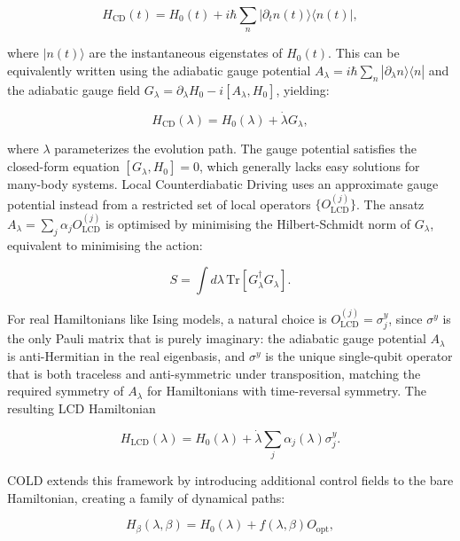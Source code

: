 \begin{equation}
    H_{\text{CD}}(t) = H_0(t) + i\hbar\sum_n |\partial_t n(t)\rangle\langle n(t)|,
\end{equation}

where $|n(t)\rangle$ are the instantaneous eigenstates of $H_0(t)$. This can be equivalently written using the adiabatic gauge potential $A_\lambda = i\hbar\sum_n |\partial_\lambda n\rangle\langle n|$ and the adiabatic gauge field $G_\lambda = \partial_\lambda H_0 - i[A_\lambda, H_0]$, yielding:

\begin{equation}
    H_{\text{CD}}(\lambda) = H_0(\lambda) + \dot{\lambda}G_\lambda,
\end{equation}

where $\lambda$ parameterizes the evolution path. The gauge potential satisfies the closed-form equation $[G_\lambda, H_0] = 0$, which generally lacks easy solutions for many-body systems. Local Counterdiabatic Driving uses an approximate gauge potential instead from a restricted set of local operators $\{O_{\text{LCD}}^{(j)}\}$. The ansatz $A_\lambda = \sum_j \alpha_j O_{\text{LCD}}^{(j)}$ is optimised by minimising the Hilbert-Schmidt norm of $G_\lambda$, equivalent to minimising the action:

\begin{equation}
    S = \int d\lambda \, \text{Tr}[G_\lambda^\dagger G_\lambda].
\end{equation}

For real Hamiltonians like Ising models, a natural choice is $O_{\text{LCD}}^{(j)} = \sigma_j^y$, since $\sigma^y$ is the only Pauli matrix that is purely imaginary: the adiabatic gauge potential $A_\lambda$ is anti-Hermitian in the real eigenbasis, and $\sigma^y$ is the unique single-qubit operator that is both traceless and anti-symmetric under transposition, matching the required symmetry of $A_\lambda$ for Hamiltonians with time-reversal symmetry\cite{COLD2023}. The resulting LCD Hamiltonian

\begin{equation}
    H_{\text{LCD}}(\lambda) = H_0(\lambda) + \dot{\lambda}\sum_j \alpha_j(\lambda) \sigma_j^y.
\end{equation}

\qquad COLD extends this framework by introducing additional control fields to the bare Hamiltonian, creating a family of dynamical paths:

\begin{equation}
    H_\beta(\lambda, \beta) = H_0(\lambda) + f(\lambda, \beta)O_{\text{opt}},
\end{equation}

